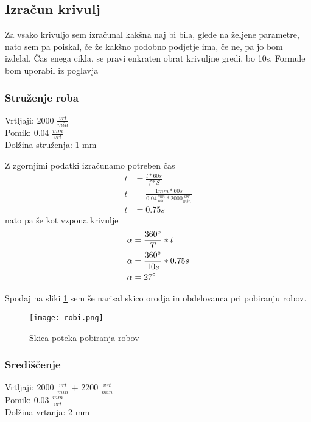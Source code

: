 \subsection{Izračun krivulj}
Za vsako krivuljo sem izračunal kakšna naj bi bila, glede na
željene parametre, nato sem pa poiskal, če že kakšno podobno
podjetje ima, če ne, pa jo bom izdelal.
Čas enega cikla, se pravi enkraten obrat krivuljne gredi, bo 10s.
Formule bom uporabil iz poglavja 

\subsubsection{Struženje roba}
Vrtljaji: 2000 \( \frac{vrt}{min} \) \\
Pomik: 0.04 \( \frac{mm}{vrt} \) \\
Dolžina struženja: 1 mm

Z zgornjimi podatki izračunamo potreben čas
\begin{equation}
	\begin{split}
		t &= \frac{l*60s}{f*S} \\
		t &= \frac{1mm*60s}{0.04\frac{mm}{obr}*2000\frac{obr}{min}} \\
		t &= 0.75 s
	\end{split}
\end{equation}
nato pa še kot vzpona krivulje
\begin{equation}
	\begin{split}
		\alpha &= \frac{360\degree}{T} * t \\
		\alpha &= \frac{360\degree}{10s} * 0.75 s\\
		\alpha &= 27\degree
	\end{split}
\end{equation}

Spodaj na sliki \ref{shema_robov} sem še narisal skico orodja
in obdelovanca pri pobiranju robov.
\begin{figure}[H]
	\begin{center}
		\texttt{[image: robi.png]}
		\caption{Skica poteka pobiranja robov
			\cite{lasten}}
		\label{shema_robov}
	\end{center}
\end{figure}

\subsubsection{Središčenje}
Vrtljaji: 2000 \( \frac{vrt}{min} \) + 2200 \( \frac{vrt}{min} \)\\
Pomik: 0.03 \( \frac{mm}{vrt} \) \\
Dolžina vrtanja: 2 mm

